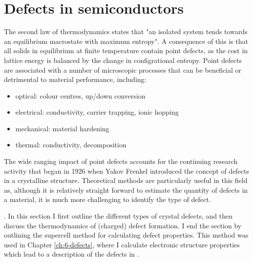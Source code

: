 \clearpage

\section{Defects in semiconductors}

The second law of thermodynamics states that "an isolated system tends towards an equilibrium macrostate with maximum entropy". A consequence of this is that all solids in equilibrium at finite temperature contain point defects, as the cost in lattice energy is balanced by the change in configrational entropy. 
Point defects are associated with a number of microscopic processes that can be beneficial or detrimental to material performance, including:
\begin{itemize}
    \item optical: colour centres, up/down conversion
    \item electrical: conductivity, carrier trapping, ionic hopping
    \item mechanical: material hardening
    \item thermal: conductivity, decomposition
\end{itemize}
The wide ranging impact of point defects accounts for the continuing research activity that began in 1926 when Yakov Frenkel introduced the concept of defects in a crystalline structure. Theoretical methods are particularly useful in this field as, although it is relatively straight forward to estimate the quantity of defects in a material, it is much more challenging to identify the type of defect.  
 
. In this section I first outline the different types of crystal defects, and then discuss the thermodynamics of (charged) defect formation. I end the section by outlining the supercell method for calculating defect properties. This method was used in Chapter \ref{ch:6-defects}, where I calculate electronic structure properties which lead to a description of the defects in .



